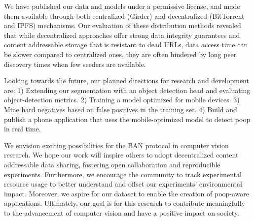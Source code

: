 \documentclass[10pt,twocolumn,letterpaper]{article}
\newif\ifnonanonymous
\newif\ifuseappendix
\begin{document}
We have published our data and models under a permissive license, and made them available through both
  centralized (Girder) and decentralized (BitTorrent and IPFS) mechanisms.
Our evaluation of these distribution methods revealed that while decentralized approaches offer strong data
  integrity guarantees and content addressable storage that is resistant to dead URLs, data access time can be
  slower compared to centralized ones, they are often hindered by long peer discovery times when few seeders
  are available.

Looking towards the future, our planned directions for research and development are:
1) Extending our segmentation with an object detection head and evaluating object-detection metrics.
2) Training a model optimized for mobile devices.
3) Mine hard negatives based on false positives in the training set.
4) Build and publish a phone application that uses the mobile-optimized model to detect poop in real time.

We envision exciting possibilities for the BAN protocol in computer vision research.
We hope our work will inspire others to adopt decentralized content addressable data sharing, fostering open
  collaboration and reproducible experiments.
Furthermore, we encourage the community to track experimental resource usage to better understand and offset
  our experiments' environmental impact.
Moreover, we aspire for our dataset to enable the creation of poop-aware applications.
Ultimately, our goal is for this research to contribute meaningfully to the advancement of computer vision
  and have a positive impact on society.
  
  
\ifnonanonymous
\section{Acknowledgements}
We would would like to thank all of the dogs that produced subject matter for the dataset, all of the
  contributors for helping to construct a challenging test set, and Anthony Hoogs for several suggestions including taking the 
  third negative picture.
\fi

{\small


}


\ifuseappendix

\fi


%
\end{document}
